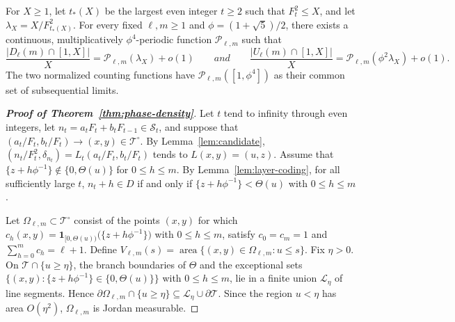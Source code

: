 \documentclass[10pt,a4paper]{amsart}
\newcommand{\Scal}{\mathcal S}
\newcommand{\Tcal}{\mathcal T}
\begin{document}
\begin{theorem}\label{thm:phase-density} For $X\geq1$, let $t_*(X)$ be the largest even integer $t\geq2$ such that $F_t^2\leq X$, and let $\lambda_X=X/F_{t_*(X)}^2$. For every fixed $\ell,m\geq1$ and $\phi=(1+\sqrt5)/2$, there exists a continuous, multiplicatively $\phi^4$-periodic function $\mathcal P_{\ell,m}$ such that 
\[
 \frac{|D_\ell(m)\cap[1,X]|}{X}
 =\mathcal P_{\ell,m}(\lambda_X)+o(1)\qquad{and}\qquad
 \frac{|U_\ell(m)\cap[1,X]|}{X}
 =\mathcal P_{\ell,m}(\phi^2\lambda_X)+o(1).
\]
The two normalized counting functions have $\mathcal P_{\ell,m}([1,\phi^4])$ as their common set of subsequential limits. 
\end{theorem}

\begin{proof}[\bf Proof of Theorem~\ref{thm:phase-density}]
Let $t$ tend to infinity through even integers, let
$n_t=a_tF_t+b_tF_{t-1}\in\Scal_t$, and suppose that
$(a_t/F_t,b_t/F_t)\to(x,y)\in\Tcal^\circ$. By
Lemma~\ref{lem:candidate},
$(n_t/F_t^2,\delta_{n_t})=L_t(a_t/F_t,b_t/F_t)$ tends to
$L(x,y)=(u,z)$.
Assume that $\{z+h\phi^{-1}\}\notin\{0,\Theta(u)\}$ for
$0\leq h\leq m$. By Lemma~\ref{lem:layer-coding}, for all sufficiently
large $t$, $n_t+h\in D$ if and only if $\{z+h\phi^{-1}\}<\Theta(u)$ with $0\leq h\leq m$.

Let $\Omega_{\ell,m}\subset\Tcal^\circ$ consist of the points $(x,y)$
for which $c_h(x,y)=\boldsymbol1_{[0,\Theta(u))}\bigl(\{z+h\phi^{-1}\}\bigr)$ with $0\leq h\leq m$, satisfy $c_0=c_m=1$ and $\sum_{h=0}^m c_h=\ell+1$. Define $V_{\ell,m}(s)=\operatorname{area}\{(x,y)\in\Omega_{\ell,m}:u\leq s\}$.
Fix $\eta>0$. On $\Tcal\cap\{u\geq\eta\}$, the branch boundaries of
$\Theta$ and the exceptional sets $\{(x,y):\{z+h\phi^{-1}\}\in\{0,\Theta(u)\}\}$ with $0\leq h\leq m$, lie in a finite union $\mathcal L_\eta$ of line segments. Hence $\partial\Omega_{\ell,m}\cap\{u\geq\eta\}\subseteq\mathcal L_\eta\cup\partial\Tcal$.
Since the region $u<\eta$ has area $O(\eta^2)$,
$\Omega_{\ell,m}$ is Jordan measurable.


\end{proof}
\end{document}
